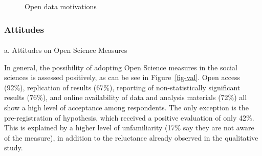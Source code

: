 \documentclass[
  letterpaper,
]{article}
\makeatletter
\let\oldparagraph\paragraph
\renewcommand{\paragraph}{
    \@ifstar
      \xxxParagraphStar
      \xxxParagraphNoStar
  }
\newcommand{\xxxParagraphStar}[1]{\oldparagraph*{#1}\mbox{}}
\newcommand{\xxxParagraphNoStar}[1]{\oldparagraph{#1}\mbox{}}
\makeatother
\begin{document}
\begin{figure}


\caption{\label{fig-motivaciones}Open data motivations}

\end{figure}%

\subsubsection{Attitudes}\label{attitudes}

\paragraph{a. Attitudes on Open Science
Measures}\label{a.-attitudes-on-open-science-measures}

In general, the possibility of adopting Open Science measures in the
social sciences is assessed positively, as can be see in
Figure~\ref{fig-val}. Open access (92\%), replication of results (67\%),
reporting of non-statistically significant results (76\%), and online
availability of data and analysis materials (72\%) all show a high level
of acceptance among respondents. The only exception is the
pre-registration of hypothesis, which received a positive evaluation of
only 42\%. This is explained by a higher level of unfamiliarity (17\%
say they are not aware of the measure), in addition to the reluctance
already observed in the qualitative study.
\end{document}
